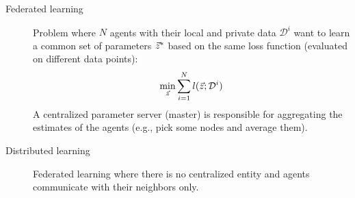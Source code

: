 \begin{description}
    \item[Federated learning] 
        Problem where $N$ agents with their local and private data $\mathcal{D}^{i}$ want to learn a common set of parameters ${\vec{z}}^*$ based on the same loss function (evaluated on different data points):
        \[
            \min_{\vec{z}} \sum_{i=1}^{N} l({\vec{z}}; \mathcal{D}^i)
        \]
        A centralized parameter server (master) is responsible for aggregating the estimates of the agents (e.g., pick some nodes and average them).

    \item[Distributed learning] 
        Federated learning where there is no centralized entity and agents communicate with their neighbors only.
\end{description}

